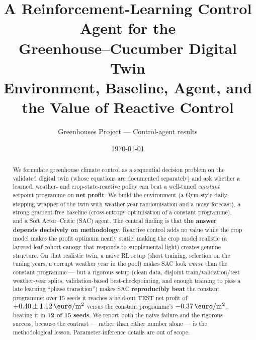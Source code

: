 \documentclass[11pt,a4paper]{article}
\title{\textbf{A Reinforcement-Learning Control Agent for the\\ Greenhouse--Cucumber Digital Twin}\\[3pt]
\large Environment, Baseline, Agent, and the Value of Reactive Control}
\author{Greenhouses Project --- Control-agent results}
\date{\today}
\newcommand{\eur}{\,\text{\euro}/\si{m^2}}
\begin{document}
\maketitle

\begin{abstract}
\noindent We formulate greenhouse climate control as a sequential decision problem on the validated
digital twin (whose equations are documented separately) and ask whether a learned, weather- and
crop-state-reactive policy can beat a well-tuned \emph{constant} setpoint programme on
\textbf{net profit}. We build the environment (a Gym-style daily-stepping wrapper of the twin with
weather-year randomisation and a noisy forecast), a strong gradient-free baseline (cross-entropy
optimisation of a constant programme), and a Soft Actor--Critic (SAC) agent. The central finding is
that \textbf{the answer depends decisively on methodology}. Reactive control adds no value while the
crop model makes the profit optimum nearly static; making the crop model realistic (a layered
leaf-cohort canopy that responds to supplemental light) creates genuine structure. On that realistic
twin, a naive RL setup (short training, selection on the tuning years, a corrupt weather year in the
pool) makes SAC look \emph{worse} than the constant programme --- but a rigorous setup (clean data,
disjoint train/validation/test weather-year splits, validation-based best-checkpointing, and enough
training to pass a late learning ``phase transition'') makes SAC \textbf{reproducibly beat} the
constant programme: over 15 seeds it reaches a held-out TEST net profit of $+0.40\pm1.12\eur$ versus
the constant programme's $-0.37\eur$, beating it in \textbf{12 of 15 seeds}. We report both the naive
failure and the rigorous success, because the contrast --- rather than either number alone --- is the
methodological lesson. Parameter-inference details are out of scope.
\end{abstract}
\end{document}
